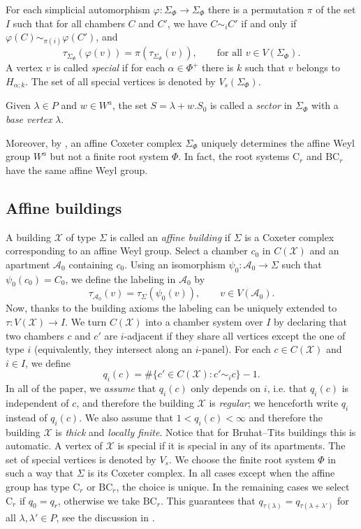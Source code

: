 \documentclass[11pt]{amsart}
\newcommand{\scrX}{\mathscr{X}}
\newcommand{\scrA}{\mathscr{A}}
\newcommand{\vphi}{\varphi}
\theoremstyle{plain}
\theoremstyle{definition}
\numberwithin{equation}{section}
\begin{document}
For each simplicial automorphism $\vphi: \Sigma_\Phi \rightarrow \Sigma_\Phi$ there is a permutation $\pi$ of the set $I$
such that for all chambers $C$ and $C'$, we have $C \sim_i C'$ if and only if $\vphi(C) \sim_{\pi(i)} \vphi(C')$, and 
\[
	\tau_{\Sigma_\Phi}(\vphi(v)) = \pi(\tau_{\Sigma_\Phi}(v)),
	\qquad\text{for all } v \in V(\Sigma_\Phi).
\]
A vertex $v$ is called \emph{special} if for each $\alpha \in \Phi^+$ there is $k$ such that $v$ belongs to $H_{\alpha; k}$.
The set of all special vertices is denoted by $V_s(\Sigma_\Phi)$. 
	
Given $\lambda \in P$ and $w \in W^a$, the set $S = \lambda + w . S_0$ is called a \emph{sector} in $\Sigma_\Phi$ with a
\emph{base vertex} $\lambda$.
	
Moreover, by \cite[Corollary 3.20]{Abramenko2008}, an affine Coxeter complex $\Sigma_\Phi$ uniquely determines the affine Weyl
group $W^a$ but not a finite root system $\Phi$. In fact, the root systems $\text{C}_r$ and $\text{BC}_r$ have the same
affine Weyl group.
	
\subsection{Affine buildings}
\label{sec:1:3}
A building $\scrX$ of type $\Sigma$ is called an \emph{affine building} if $\Sigma$ is a Coxeter complex corresponding
to an affine Weyl group. Select a chamber $c_0$ in $C(\scrX)$ and an apartment $\scrA_0$ containing $c_0$. Using
an isomorphism $\psi_0: \scrA_0 \rightarrow \Sigma$ such that $\psi_0(c_0) = C_0$, we define the labeling in $\scrA_0$ by
\[
	\tau_{\scrA_0}(v) = \tau_\Sigma(\psi_0(v)), \qquad v \in V(\scrA_0).
\]
Now, thanks to the building axioms the labeling can be uniquely extended to $\tau: V(\scrX) \rightarrow I$. We turn 
$C(\scrX)$ into a chamber system over $I$ by declaring that two chambers $c$ and $c'$ are $i$-adjacent if they share all
vertices except the one of type $i$ (equivalently, they intersect along an $i$-panel). For each $c \in C(\scrX)$ and $i \in I$,
we define
\[
	q_i(c) = \#\big\{c' \in C(\scrX) : c' \sim_i c \big\} - 1.
\]
In all of the paper, we \emph{assume} that $q_i(c)$ only depends on $i$, i.e. that $q_i(c)$ is independent of $c$, and therefore 
the building $\scrX$ is \emph{regular}; we henceforth write $q_i$ instead of $q_i(c)$. We also assume that $1 < q_i(c) < \infty$
and therefore the building $\scrX$ is \emph{thick} and \emph{locally finite}. Notice that for Bruhat--Tits buildings this is 
automatic. A vertex of $\scrX$ is special if it is special in any of its apartments. The set of special vertices is denoted by 
$V_s$. We choose the finite root system $\Phi$ in such a way that $\Sigma$ is its Coxeter complex. In all cases except when the
affine group has type $\text{C}_r$ or $\text{BC}_r$, the choice is unique. In the remaining cases we select $\text{C}_r$
if $q_0 = q_r$, otherwise we take $\text{BC}_r$. This guarantees that $q_{\tau(\lambda)} = q_{\tau(\lambda+\lambda')}$
for all $\lambda, \lambda' \in P$, see the discussion in \cite[Section 2.13]{mz1}.
\end{document}
